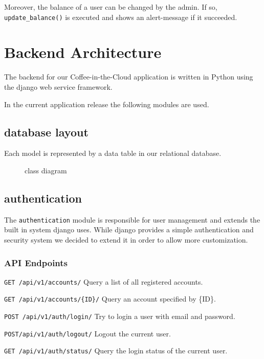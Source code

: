 Moreover, the balance of a user can be changed by the admin. If so,
\texttt{update\_balance()} is executed and shows an alert-message if it
succeeded.

\newpage
\section{Backend Architecture}\label{backend-architecture}

The backend for our Coffee-in-the-Cloud application is written in Python
using the django web service framework.

In the current application release the following modules are used.

\subsection{database layout}\label{database-layout}

Each model is represented by a data table in our relational database.

\begin{figure}[htbp]
\centering
{}
\caption{class diagram}
\end{figure}

\subsection{authentication}\label{authentication}

The \texttt{authentication} module is responsible for user management
and extends the built in system django uses. While django provides a
simple authentication and security system we decided to extend it in
order to allow more customization.

\subsubsection{API Endpoints}\label{api-endpoints}

\texttt{GET\ /api/v1/accounts/} Query a list of all registered accounts.

\texttt{GET\ /api/v1/accounts/\{ID\}/} Query an account specified by
\{ID\}.

\texttt{POST\ /api/v1/auth/login/} Try to login a user with email and
password.

\texttt{POST/api/v1/auth/logout/} Logout the current user.

\texttt{GET\ /api/v1/auth/status/} Query the login status of the current
user.

